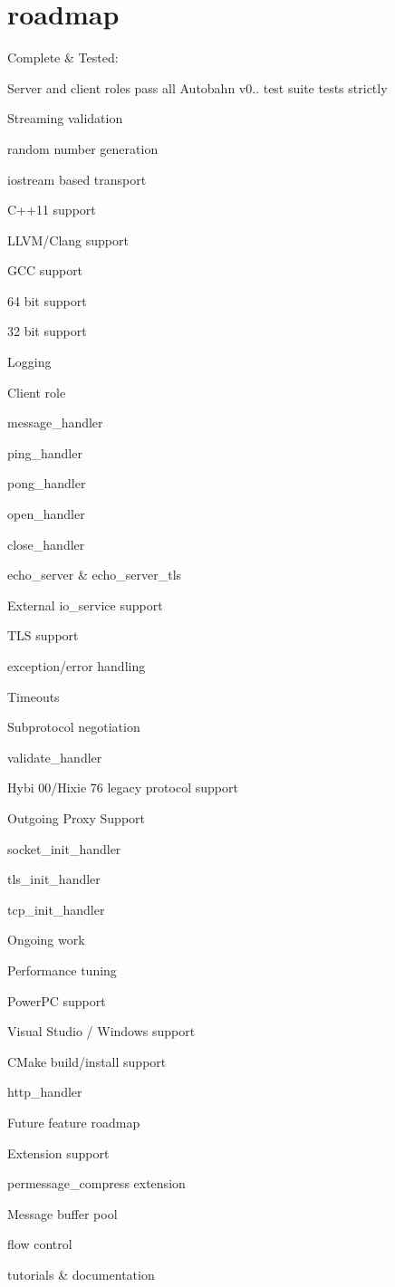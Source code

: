\chapter{roadmap}
\hypertarget{md_libraries_2fc_2vendor_2websocketpp_2roadmap}{}\label{md_libraries_2fc_2vendor_2websocketpp_2roadmap}
Complete \& Tested\+:
\begin{DoxyItemize}
\item Server and client roles pass all Autobahn v0.. test suite tests strictly
\item Streaming  validation
\item random number generation
\item iostream based transport
\item C++11 support
\item LLVM/\+Clang support
\item GCC support
\item 64 bit support
\item 32 bit support
\item Logging
\item Client role
\item message\+\_\+handler
\item ping\+\_\+handler
\item pong\+\_\+handler
\item open\+\_\+handler
\item close\+\_\+handler
\item echo\+\_\+server \& echo\+\_\+server\+\_\+tls
\item External io\+\_\+service support
\item TLS support
\item exception/error handling
\item Timeouts
\item Subprotocol negotiation
\item validate\+\_\+handler
\item Hybi 00/\+Hixie 76 legacy protocol support
\item Outgoing Proxy Support
\item socket\+\_\+init\+\_\+handler
\item tls\+\_\+init\+\_\+handler
\item tcp\+\_\+init\+\_\+handler
\end{DoxyItemize}

Ongoing work
\begin{DoxyItemize}
\item Performance tuning
\item Power\+PC support
\item Visual Studio / Windows support
\item CMake build/install support
\item http\+\_\+handler
\end{DoxyItemize}

Future feature roadmap
\begin{DoxyItemize}
\item Extension support
\item permessage\+\_\+compress extension
\item Message buffer pool
\item flow control
\item tutorials \& documentation 
\end{DoxyItemize}